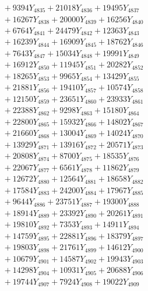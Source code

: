 \documentclass[a4paper,10pt]{article}
\begin{document}
{\begin{align}
&\;  + 9394 Y_{4835} + 21018 Y_{4836} + 19495 Y_{4837} \\[0.3ex]
&\;  + 16267 Y_{4838} + 20000 Y_{4839} + 16256 Y_{4840} \\[0.3ex]
&\;  + 6764 Y_{4841} + 24479 Y_{4842} + 12363 Y_{4843} \\[0.3ex]
&\;  + 16239 Y_{4844} + 16909 Y_{4845} + 18762 Y_{4846} \\[0.3ex]
&\;  + 7643 Y_{4847} + 15034 Y_{4848} + 19991 Y_{4849} \\[0.3ex]
&\;  + 16912 Y_{4850} + 11945 Y_{4851} + 20282 Y_{4852} \\[0.3ex]
&\;  + 18265 Y_{4853} + 9965 Y_{4854} + 13429 Y_{4855} \\[0.3ex]
&\;  + 21881 Y_{4856} + 19410 Y_{4857} + 10574 Y_{4858} \\[0.5ex]\allowbreak
&\;  + 12150 Y_{4859} + 23651 Y_{4860} + 23933 Y_{4861} \\[0.3ex]
&\;  + 22388 Y_{4862} + 9298 Y_{4863} + 15180 Y_{4864} \\[0.3ex]
&\;  + 22800 Y_{4865} + 15932 Y_{4866} + 14802 Y_{4867} \\[0.3ex]
&\;  + 21660 Y_{4868} + 13004 Y_{4869} + 14024 Y_{4870} \\[0.3ex]
&\;  + 13929 Y_{4871} + 13916 Y_{4872} + 20571 Y_{4873} \\[0.3ex]
&\;  + 20808 Y_{4874} + 8700 Y_{4875} + 18535 Y_{4876} \\[0.3ex]
&\;  + 22067 Y_{4877} + 6561 Y_{4878} + 11862 Y_{4879} \\[0.3ex]
&\;  + 12672 Y_{4880} + 12564 Y_{4881} + 18658 Y_{4882} \\[0.3ex]
&\;  + 17584 Y_{4883} + 24200 Y_{4884} + 17967 Y_{4885} \\[0.3ex]
&\;  + 9644 Y_{4886} + 23751 Y_{4887} + 19300 Y_{4888} \\[0.5ex]\allowbreak
&\;  + 18914 Y_{4889} + 23392 Y_{4890} + 20261 Y_{4891} \\[0.3ex]
&\;  + 19810 Y_{4892} + 7353 Y_{4893} + 14911 Y_{4894} \\[0.3ex]
&\;  + 14759 Y_{4895} + 22881 Y_{4896} + 18379 Y_{4897} \\[0.3ex]
&\;  + 19803 Y_{4898} + 21761 Y_{4899} + 14612 Y_{4900} \\[0.3ex]
&\;  + 10679 Y_{4901} + 14587 Y_{4902} + 19943 Y_{4903} \\[0.3ex]
&\;  + 14298 Y_{4904} + 10931 Y_{4905} + 20688 Y_{4906} \\[0.3ex]
&\;  + 19744 Y_{4907} + 7924 Y_{4908} + 19022 Y_{4909} \\[0.3ex]

\end{align}}
\end{document}
